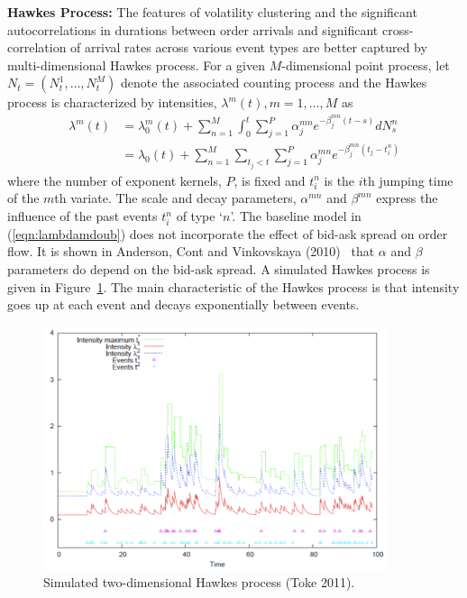 \noindent\textbf{Hawkes Process:} The features of volatility clustering and the significant autocorrelations in durations between order arrivals and significant cross-correlation of arrival rates across various event types are better captured by multi-dimensional Hawkes process. For a given $M$-dimensional point process, let $N_t=(N_t^1,\ldots,N_t^M)$ denote the associated counting process and the Hawkes process is characterized by intensities, $\lambda^m(t), m=1,\ldots,M$ as
	\begin{equation}\label{eqn:lambdamdoub}
	\begin{split}
	\lambda^m(t)&= \lambda_0^m(t) + \sum_{n=1}^M \int_0^t \sum_{j=1}^P \alpha_j^{mn} e^{-\beta_j^{mn}(t-s)} dN_s^n \\
	&=\lambda_0(t) + \sum_{n=1}^M \sum_{t_j<t} \sum_{j=1}^P \alpha_j^{mn} e^{-\beta_j^{mn}(t_j -t_i^n)}
	\end{split}
	\end{equation}
where the number of exponent kernels, $P$, is fixed and $t_i^n$ is the $i$th jumping time of the $m$th variate. The scale and decay parameters, $\alpha^{mn}$ and $\beta^{mn}$ express the influence of the past events $t_i^n$ of type `$n$'. The baseline model in (\ref{eqn:lambdamdoub}) does not incorporate the effect of bid-ask spread on order flow. It is shown in Anderson, Cont and Vinkovskaya (2010)~\cite{} that $\alpha$ and $\beta$ parameters do depend on the bid-ask spread. A simulated Hawkes process is given in Figure~\ref{fig:hawkes}. The main characteristic of the Hawkes process is that intensity goes up at each event and decays exponentially between events. 
	\begin{figure}[!ht]
   	\centering
   	\includegraphics[width=0.9\textwidth]{chapters/chapter_trade_data_models/figures/hawkes.png} 
   	\caption{Simulated two-dimensional Hawkes process (Toke 2011). \label{fig:hawkes}}
	\end{figure}

